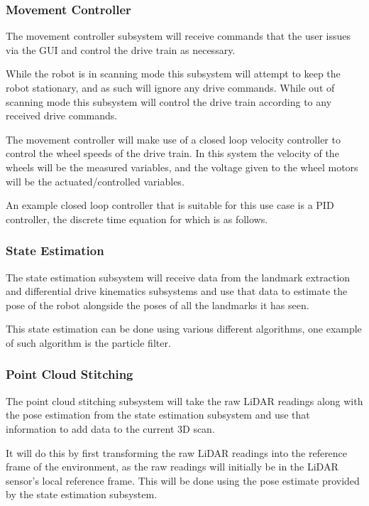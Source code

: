 \documentclass[12pt]{article}
\begin{document}
\subsubsection{Movement Controller}
    The movement controller subsystem will receive commands that the user issues via the GUI and control the drive train as necessary.
    
    While the robot is in scanning mode this subsystem will attempt to keep the robot stationary, and as such will ignore any drive commands. While out of scanning mode this subsystem will control the drive train according to any received drive commands.

    The movement controller will make use of a closed loop velocity controller to control the wheel speeds of the drive train. In this system the velocity of the wheels will be the measured variables, and the voltage given to the wheel motors will be the actuated/controlled variables.

    An example closed loop controller that is suitable for this use case is a PID controller, the discrete time equation for which is as follows.



\subsubsection{State Estimation}
    The state estimation subsystem will receive data from the landmark extraction and differential drive kinematics subsystems and use that data to estimate the pose of the robot alongside the poses of all the landmarks it has seen.
    
    This state estimation can be done using various different algorithms, one example of such algorithm is the particle filter.

\subsubsection{Point Cloud Stitching}
    The point cloud stitching subsystem will take the raw LiDAR readings along with the pose estimation from the state estimation subsystem and use that information to add data to the current 3D scan.

    It will do this by first transforming the raw LiDAR readings into the reference frame of the environment, as the raw readings will initially be in the LiDAR sensor's local reference frame. This will be done using the pose estimate provided by the state estimation subsystem.
\end{document}

